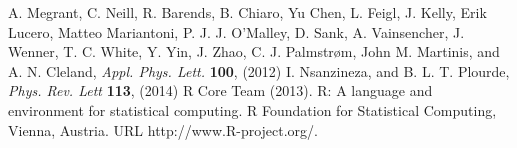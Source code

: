 \documentclass[aip,jap,reprint,nobalancelastpage]{revtex4-1}
\begin{document}
\begin{thebibliography}{99}
 A.  Megrant, C.  Neill, R.  Barends, B.  Chiaro,  Yu Chen, L.  Feigl, J.  Kelly,  Erik Lucero,  Matteo Mariantoni, P. J. J.  O’Malley, D.  Sank, A.  Vainsencher, J.  Wenner, T. C.  White, Y.  Yin, J.  Zhao, C. J.  Palmstrøm,  John M. Martinis, and A. N.  Cleland, \textit{Appl. Phys. Lett.} \textbf{100},  (2012)
 I.  Nsanzineza, and B. L. T.  Plourde, \textit{Phys. Rev. Lett} \textbf{113},  (2014)
  R Core Team (2013). R: A language and environment for statistical computing. R Foundation for Statistical Computing, Vienna, Austria.  URL http://www.R-project.org/.

\end{thebibliography}
\end{document}
